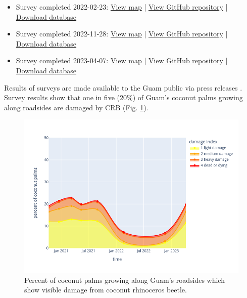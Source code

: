 \begin{refsection}
\begin{itemize}
\item Survey completed 2022-02-23: 
\href{https://aubreymoore.github.io/Guam-CRB-Damage-Map-2022-02/webmap/#11/13.4483/144.7860}{View map} | 
\href{https://github.com/aubreymoore/Guam-CRB-Damage-Map-2022-02}{View GitHub repository} | 
\href{https://github.com/aubreymoore/Guam-CRB-Damage-Map-2022-02/raw/main/Guam-CRB-Damage-Map-2022-02.db}{Download database}

\item Survey completed 2022-11-28: 
\href{https://aubreymoore.github.io/Guam-CRB-Damage-Map-2022-11/webmap/#11/13.4483/144.7860}{View map} | 
\href{https://github.com/aubreymoore/Guam-CRB-Damage-Map-2022-11}{View GitHub repository} | 
\href{https://github.com/aubreymoore/Guam-CRB-Damage-Map-2022-11/raw/main/output/Guam07.db}{Download database}

\item Survey completed 2023-04-07:  
\href{https://aubreymoore.github.io/Guam-CRB-Damage-Map-2023-04/webmap/#11/13.4483/144.7860}{View map} | 
\href{https://github.com/aubreymoore/Guam-CRB-Damage-Map-2023-04}{View GitHub repository} | 
\href{https://github.com/aubreymoore/Guam-CRB-Damage-Map-2023-04/raw/main/output/results.db}{Download database}

\end{itemize}

Results of surveys are made available to the Guam public via press releases \cite{moorePressRelease2023}. Survey results show that one in five (20\%) of Guam's coconut palms growing along roadsides are damaged by CRB (Fig. \ref{fig:timeline}).

\begin{figure}[H]
	\centering
	\includegraphics[width=1\linewidth]{images/timeline}
	\caption{Percent of coconut palms growing along Guam's roadsides which show visible damage from coconut rhinoceros beetle.}
	\label{fig:timeline}
\end{figure}




\end{refsection}

